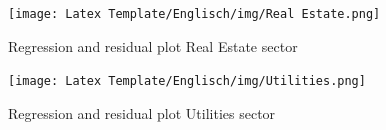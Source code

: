 \documentclass[a4paper,12pt]{article}
\begin{document}
\begin{figure}[!h]
  \centering
    \texttt{[image: Latex Template/Englisch/img/Real Estate.png]}
    \caption{Regression and residual plot Real Estate sector}
    \hfill
\end{figure}


\makeatletter
\setlength{\@fptop}{0pt}
\makeatother

 \begin{figure}[!h]
    \texttt{[image: Latex Template/Englisch/img/Utilities.png]}
    \caption{Regression and residual plot Utilities sector}
    \hfill
\end{figure}
\end{document}
